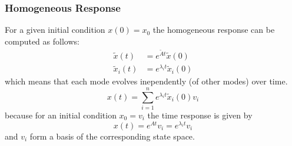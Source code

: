 \subsubsection{Homogeneous Response}
For a given initial condition $x(0)=x_0$ the homogeneous response can be computed as follows:\\
\begin{align*}
    \tilde{x}(t)   & =e^{\tilde{A}t}\tilde{x}(0)     \\
    \tilde{x}_i(t) & =e^{\lambda_{i}t}\tilde{x}_i(0)
\end{align*}
which means that each mode evolves inependently (of other modes) over time.\\
\begin{equation*}
    x(t)=\sum_{i=1}^ne^{\lambda_it}\tilde{x}_i(0)v_i
\end{equation*}
because for an initial condition $x_0 = v_i$ the time response is given by
\begin{equation*}
    x(t)=e^{At}v_i=e^{\lambda_it}v_i
\end{equation*}
and $v_i$ form a basis of the corresponding state space.

